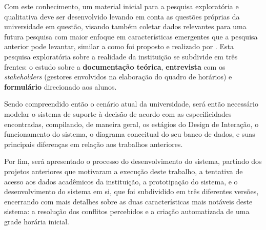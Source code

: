 Com este conhecimento, um material inicial para a pesquisa exploratória e qualitativa deve ser desenvolvido levando em conta as questões próprias da universidade em questão, visando também coletar dados relevantes para uma futura pesquisa com maior enfoque em características emergentes que a pesquisa anterior pode levantar, similar a como foi proposto e realizado por . Esta pesquisa exploratória sobre a realidade da instituição se subdivide em três frentes: o estudo sobre a \textbf{documentação teórica}, \textbf{entrevista} com os \textit{stakeholders} (gestores envolvidos na elaboração do quadro de horários) e \textbf{formulário} direcionado aos alunos.


Sendo compreendido então o cenário atual da universidade, será então necessário modelar o sistema de suporte à decisão de acordo com as especificidades encontradas, compilando, de maneira geral, os estágios do Design de Interação, o funcionamento do sistema, o diagrama conceitual do seu banco de dados, e suas principais diferenças em relação aos trabalhos anteriores.

Por fim, será apresentado o processo do desenvolvimento do sistema, partindo dos projetos anteriores que motivaram a execução deste trabalho, a tentativa de acesso aos dados acadêmicos da instituição, a prototipação do sistema, e o desenvolvimento do sistema em si, que foi subdividido em três diferentes versões, encerrando com mais detalhes sobre as duas características mais notáveis deste sistema: a resolução dos conflitos percebidos e a criação automatizada de uma grade horária inicial.

